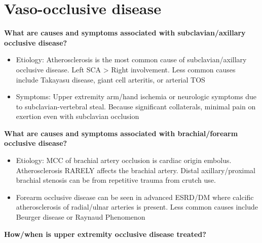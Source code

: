 \documentclass[
]{book}
\begin{document}
\hypertarget{vaso-occlusive-disease}{%
\section{Vaso-occlusive disease}\label{vaso-occlusive-disease}}

\textbf{What are causes and symptoms associated with subclavian/axillary
occlusive disease?} \citep{jacklcronenwettVascularDecisionMaking2020}

\begin{itemize}
\item
  Etiology: Atherosclerosis is the most common cause of
  subclavian/axillary occlusive disease. Left SCA \textgreater{} Right involvement.
  Less common causes include Takayasu disease, giant cell arteritis,
  or arterial TOS
\item
  Symptoms: Upper extremity arm/hand ischemia or neurologic symptoms
  due to subclavian-vertebral steal. Because significant collaterals,
  minimal pain on exertion even with subclavian occlusion
\end{itemize}

\textbf{What are causes and symptoms associated with brachial/forearm
occlusive disease?}

\begin{itemize}
\item
  Etiology: MCC of brachial artery occlusion is cardiac origin
  embolus. Atherosclerosis RARELY affects the brachial artery. Distal
  axillary/proximal brachial stenosis can be from repetitive trauma
  from crutch use.~
\item
  Forearm occlusive disease can be seen in advanced ESRD/DM where
  calcific atherosclerosis of radial/ulnar arteries is present. Less
  common causes include Beurger disease or Raynaud Phenomenon
\end{itemize}

\textbf{How/when is upper extremity occlusive disease treated?}
\end{document}
